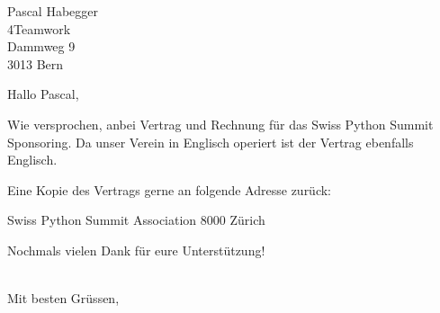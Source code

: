 \documentclass[SN,11pt,enlargefirstpage=true,sps]{scrlttr2}
\begin{document}
\begin{letter}{Pascal Habegger\\4Teamwork\\Dammweg 9\\3013 Bern}

  \opening{Hallo Pascal,}

    Wie versprochen, anbei Vertrag und Rechnung für das Swiss Python Summit
    Sponsoring. Da unser Verein in Englisch operiert ist der Vertrag ebenfalls
    Englisch.

    Eine Kopie des Vertrags gerne an folgende Adresse zurück:

    Swiss Python Summit Association
    8000 Zürich

    Nochmals vielen Dank für eure Unterstützung!

  \closing{\\Mit besten Grüssen,}

\end{letter}
\end{document}
